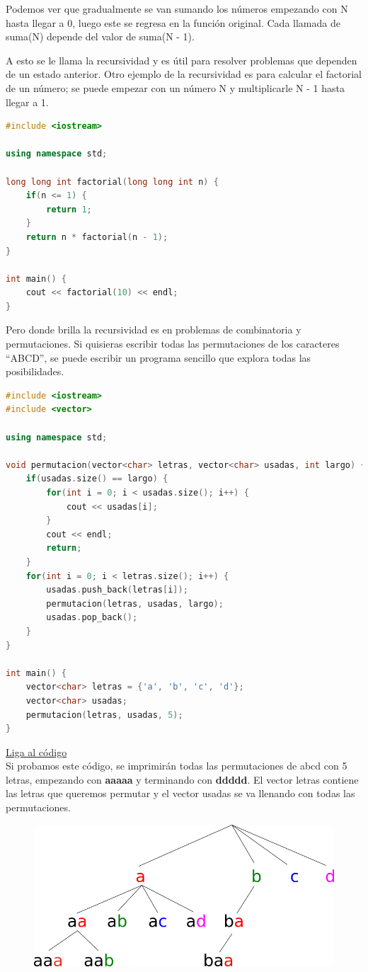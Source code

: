\documentclass{article}
\begin{document}
Podemos ver que gradualmente se van sumando los números empezando con N hasta llegar a 0, luego este se regresa en la función original. Cada llamada de suma(N) depende del valor de suma(N - 1).

A esto se le llama la recursividad y es útil para resolver problemas que dependen de un estado anterior. Otro ejemplo de la recursividad es para calcular el factorial de un número; se puede empezar con un número N y multiplicarle N - 1 hasta llegar a 1.

\begin{lstlisting}[language=C++, title=Factorial recursivo]
#include <iostream>

using namespace std;

long long int factorial(long long int n) {
	if(n <= 1) {
		return 1;
	}
	return n * factorial(n - 1);
}

int main() {
	cout << factorial(10) << endl;
}
\end{lstlisting}

Pero donde brilla la recursividad es en problemas de combinatoria y permutaciones. Si quisieras escribir todas las permutaciones de los caracteres ``ABCD'', se puede escribir un programa sencillo que explora todas las posibilidades.

\begin{lstlisting}[language=C++, title=Permutaciones]
#include <iostream>
#include <vector>

using namespace std;

void permutacion(vector<char> letras, vector<char> usadas, int largo) {
	if(usadas.size() == largo) {
		for(int i = 0; i < usadas.size(); i++) {
			cout << usadas[i];
		}
		cout << endl;
		return;
	}
	for(int i = 0; i < letras.size(); i++) {
		usadas.push_back(letras[i]);
		permutacion(letras, usadas, largo);
		usadas.pop_back();
	}
}

int main() {
	vector<char> letras = {'a', 'b', 'c', 'd'};
	vector<char> usadas;
	permutacion(letras, usadas, 5);
}
\end{lstlisting}
\href{https://repl.it/@Jamesscn/Permutando}{Liga al código} \\

Si probamos este código, se imprimirán todas las permutaciones de abcd con 5 letras, empezando con \textbf{aaaaa} y terminando con \textbf{ddddd}. El vector letras contiene las letras que queremos permutar y el vector usadas se va llenando con todas las permutaciones.

\begin{figure}[H]
    \centering
    \includegraphics[width=0.3\paperwidth]{permutacion}
\end{figure}
\end{document}
